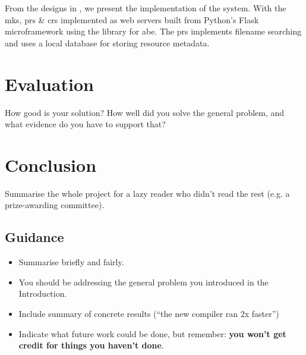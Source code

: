 \documentclass[british]{l4proj}
\begin{document}
From the designs in , we present the implementation of the \theResServer system. With the \acrfull{mks}, \acrfull{prs} \& \acrfull{crs} implemented as web servers built from Python's Flask microframework using the \PyOpenABE library for \acrfull{abe}. The \acrshort{prs} implements filename searching and uses a local database for storing resource metadata.











\chapter{Evaluation}
\label{ch:evaluation}
How good is your solution? How well did you solve the general problem, and what evidence do you have to support that?







\chapter{Conclusion}
\label{ch:conclusion}
Summarise the whole project for a lazy reader who didn't read the rest (e.g. a prize-awarding committee).
\section{Guidance}
\begin{itemize}
    \item
        Summarise briefly and fairly.
    \item
        You should be addressing the general problem you introduced in the
        Introduction.
    \item
        Include summary of concrete results (``the new compiler ran 2x
        faster'')
    \item
        Indicate what future work could be done, but remember: \textbf{you
        won't get credit for things you haven't done}.
\end{itemize}
\end{document}
